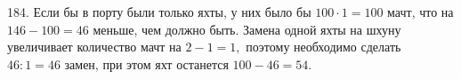 184. Если бы в порту были только яхты, у них было бы $100\cdot1=100$ мачт, что на $146-100=46$ меньше, чем должно быть. Замена одной яхты на шхуну увеличивает количество мачт на $2-1=1,$ поэтому необходимо сделать $46:1=46$ замен, при этом яхт останется $100-46=54.$\\
